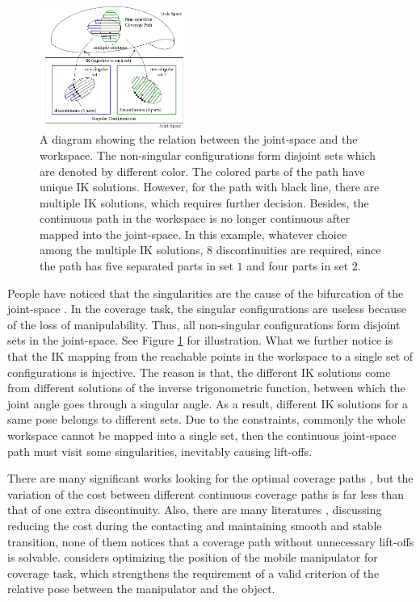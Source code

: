 \documentclass[journal]{IEEEtran}
\begin{document}
 
\begin{figure}[t]
\centering
\includegraphics[width = 0.44\textwidth]{fig1}
\caption{A diagram showing the relation between the joint-space and the workspace. The non-singular configurations form disjoint sets which are denoted by different color. 
The colored parts of the path have unique IK solutions. 
However, for the path with black line, there are multiple IK solutions, which requires further decision. 
Besides, the continuous path in the workspace is no longer continuous after mapped into the joint-space. In this example, whatever choice among the multiple IK solutions, $8$ discontinuities are required, since the path has five separated parts in set $1$ and four parts in set $2$. 
}\label{fig1}
\end{figure}

People have noticed that the singularities are the cause of the bifurcation of the joint-space \cite{porta2010path} \cite{Porta2012Randomized}. In the coverage task, the singular configurations are useless because of the loss of manipulability. Thus, all non-singular configurations form disjoint sets in the joint-space. See Figure \ref{fig1} for illustration. 
What we further notice is that the IK mapping from the reachable points in the workspace to a single set of configurations is injective. 
The reason is that, the different IK solutions come from different solutions of the inverse trigonometric function, between which the joint angle goes through a singular angle. 
As a result, different IK solutions for a same pose belongs to different sets.
Due to the constraints, commonly the whole workspace cannot be mapped into a single set, then the continuous joint-space path must visit some singularities, inevitably causing lift-offs. 

There are many significant works looking for the optimal coverage paths \cite{Atkar2003Towards} \cite{huang2001optimal}, but the variation of the cost between different continuous coverage paths is far less than that of one extra discontinuity. Also, there are many literatures \cite{cheah2003brief} \cite{heck2015switched} \cite{mirrazavi2018a} \cite{solanes2018adaptive}, \cite{solanes2019robust} discussing reducing the cost during the contacting and maintaining smooth and stable transition, none of them notices that a coverage path without unnecessary lift-offs is solvable. 
\cite{paus2017a} considers optimizing the position of the mobile manipulator for coverage task, which strengthens the requirement of a valid criterion of the relative pose between the manipulator and the object. 
\end{document}
